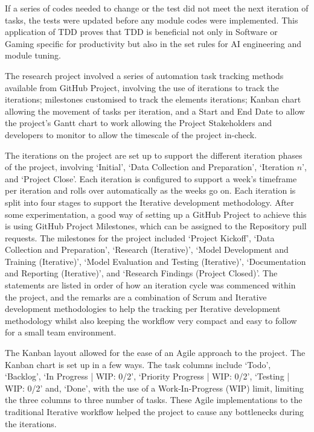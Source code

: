 \documentclass[12pt]{report} %
\begin{document}
		If a series of codes needed to change or the test did not meet the next iteration of tasks, the tests were updated before any module codes were implemented. This application of TDD proves that TDD is beneficial not only in Software or Gaming specific for productivity but also in the set rules for AI engineering and module tuning.

		The research project involved a series of automation task tracking methods available from GitHub Project, involving the use of iterations to track the iterations; milestones customised to track the elements iterations; Kanban chart allowing the movement of tasks per iteration, and a Start and End Date to allow the project's Gantt chart to work allowing the Project Stakeholders and developers to monitor to allow the timescale of the project in-check.

		The iterations on the project are set up to support the different iteration phases of the project, involving `Initial', `Data Collection and Preparation', `Iteration $n$', and `Project Close'. Each iteration is configured to support a week's timeframe per iteration and rolls over automatically as the weeks go on. Each iteration is split into four stages to support the Iterative development methodology. After some experimentation, a good way of setting up a GitHub Project to achieve this is using GitHub Project Milestones, which can be assigned to the Repository pull requests. The milestones for the project included `Project Kickoff', `Data Collection and Preparation', `Research (Iterative)', `Model Development and Training (Iterative)', `Model Evaluation and Testing (Iterative)', `Documentation and Reporting (Iterative)', and `Research Findings (Project Closed)'. The statements are listed in order of how an iteration cycle was commenced within the project, and the remarks are a combination of Scrum and Iterative development methodologies to help the tracking per Iterative development methodology whilst also keeping the workflow very compact and easy to follow for a small team environment.

		The Kanban layout allowed for the ease of an Agile approach to the project. The Kanban chart is set up in a few ways. The task columns include `Todo', `Backlog', `In Progress | WIP: 0/2', `Priority Progress | WIP: 0/2', `Testing | WIP: 0/2' and, `Done', with the use of a Work-In-Progress (WIP) limit, limiting the three columns to three number of tasks. These Agile implementations to the traditional Iterative workflow helped the project to cause any bottlenecks during the iterations.
\end{document}
